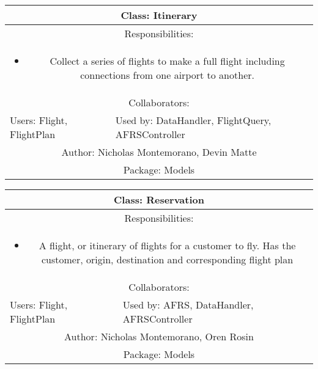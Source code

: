\begin{center}
    \begin{tabular}{ |p{7cm}|p{7cm}|  }
        \hline
        \multicolumn{2}{|c|}{Class: Itinerary} \\
        \hline
        \multicolumn{2}{|c|}{Responsibilities:} \\ \multicolumn{2}{|c|}{\parbox{0.9\textwidth}{
        \begin{itemize}
            \item Collect a series of flights to make a full flight including connections from one airport to another.
        \end{itemize} }} \\
        \hline
        \multicolumn{2}{|c|}{Collaborators:} \\
        \hline
        Users: Flight, FlightPlan & Used by: DataHandler, FlightQuery, AFRSController \\
        \hline
        \multicolumn{2}{|c|}{Author: Nicholas Montemorano, Devin Matte} \\
        \hline
        \multicolumn{2}{|c|}{Package: Models} \\
        \hline
    \end{tabular}
\end{center}


\begin{center}
    \begin{tabular}{ |p{7cm}|p{7cm}|  }
        \hline
        \multicolumn{2}{|c|}{Class: Reservation} \\
        \hline
        \multicolumn{2}{|c|}{Responsibilities:} \\ \multicolumn{2}{|c|}{\parbox{0.9\textwidth}{
        \begin{itemize}
            \item A flight, or itinerary of flights for a customer to fly. Has the customer, origin, destination and corresponding flight plan
        \end{itemize} }} \\
        \hline
        \multicolumn{2}{|c|}{Collaborators:} \\
        \hline
        Users: Flight, FlightPlan & Used by: AFRS, DataHandler, AFRSController \\
        \hline
        \multicolumn{2}{|c|}{Author: Nicholas Montemorano, Oren Rosin} \\
        \hline
        \multicolumn{2}{|c|}{Package: Models} \\
        \hline
    \end{tabular}
\end{center}

